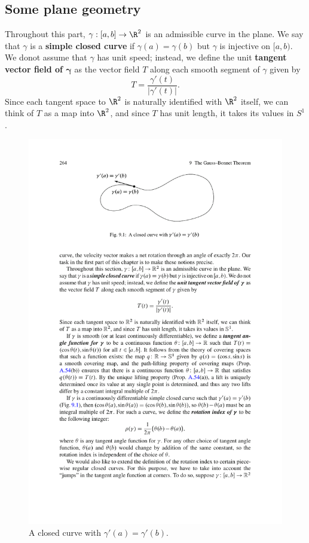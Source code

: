 \subsection{Some plane geometry}
Throughout this part, $\gamma:[a,b]\to\R^2$ is an admissible curve in the plane. We say that $\gamma$ is a \textbf{simple closed curve} if $\gamma(a)=\gamma(b)$ but 
$\gamma$ is injective on $[a,b)$. We donot assume that $\gamma$ has unit speed; instead, we define the unit \textbf{tangent vector field of $\bm{\gamma}$} as the vector 
field $T$ along each smooth segment of $\gamma$ given by
\[T=\frac{\gamma'(t)}{|\gamma'(t)|}.\]
Since each tangent space to $\R^2$ is naturally identified with $\R^2$ itself, we can think of $T$ as a map into $\R^2$, and since $T$ has unit length, it takes its 
values in $S^1$.
\begin{figure}[htbp]
\centering
\includegraphics{pictures/closed-smooth-curve}
\caption{A closed curve with $\gamma'(a)=\gamma'(b)$.}
\end{figure}

